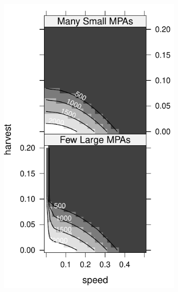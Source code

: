 \documentclass[12pt,english]{article}
\begin{document}
\begin{spacing}{1.9}
\begin{figure}[htbp]
\begin{subfigure}{.33\textwidth}
\subcaption{}
\includegraphics[width=1\textwidth]{plots/MPAs.pdf}
\label{nomang}
\end{subfigure}
\begin{subfigure}{.33\textwidth}
\subcaption{}

\end{subfigure}
\end{figure}
\end{spacing}
\end{document}
